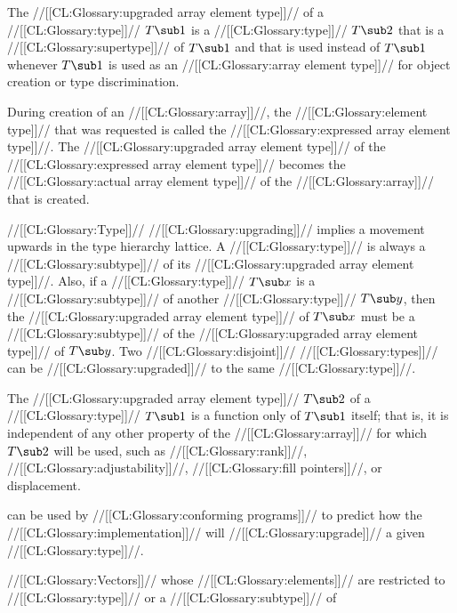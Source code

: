 The //[[CL:Glossary:upgraded array element type]]// of a //[[CL:Glossary:type]]// $T\sub 1$ is a //[[CL:Glossary:type]]// $T\sub 2$ that is a //[[CL:Glossary:supertype]]// of $T\sub 1$ and that is used instead of $T\sub 1$ whenever $T\sub 1$ is used as an //[[CL:Glossary:array element type]]//  for object creation or type discrimination.

During creation of an //[[CL:Glossary:array]]//, the //[[CL:Glossary:element type]]// that was requested  is called the //[[CL:Glossary:expressed array element type]]//. The //[[CL:Glossary:upgraded array element type]]// of the //[[CL:Glossary:expressed array element type]]// becomes the //[[CL:Glossary:actual array element type]]// of the //[[CL:Glossary:array]]// that is created.

//[[CL:Glossary:Type]]// //[[CL:Glossary:upgrading]]// implies a movement upwards in the type hierarchy lattice. A //[[CL:Glossary:type]]// is always a //[[CL:Glossary:subtype]]// of its //[[CL:Glossary:upgraded array element type]]//. Also, if a //[[CL:Glossary:type]]// $T\sub x$ is a //[[CL:Glossary:subtype]]// of another //[[CL:Glossary:type]]// $T\sub y$, then the //[[CL:Glossary:upgraded array element type]]// of $T\sub x$  must be a //[[CL:Glossary:subtype]]// of the //[[CL:Glossary:upgraded array element type]]// of $T\sub y$. Two //[[CL:Glossary:disjoint]]// //[[CL:Glossary:types]]// can be //[[CL:Glossary:upgraded]]// to the same //[[CL:Glossary:type]]//.

The //[[CL:Glossary:upgraded array element type]]// $T\sub 2$ of a //[[CL:Glossary:type]]// $T\sub 1$ is a function only of $T\sub 1$ itself; that is, it is independent of any other property of the //[[CL:Glossary:array]]//  for which $T\sub 2$ will be used, such as //[[CL:Glossary:rank]]//, //[[CL:Glossary:adjustability]]//, //[[CL:Glossary:fill pointers]]//, or displacement.

  can be used by //[[CL:Glossary:conforming programs]]// to predict how the //[[CL:Glossary:implementation]]// will //[[CL:Glossary:upgrade]]// a given //[[CL:Glossary:type]]//.

\endsubsubsection%

 

//[[CL:Glossary:Vectors]]// whose //[[CL:Glossary:elements]]// are restricted to //[[CL:Glossary:type]]//   or a //[[CL:Glossary:subtype]]// of 

